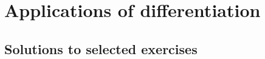 \documentclass[../book/calcnotes.tex]{subfiles}
\begin{document}
\chapter{Applications of differentiation}
\label{ch:derivative-applications}

\section{Solutions to selected exercises}
\label{sec:derivative-applications.solns}
\printsolutions[chapter]
\end{document}

